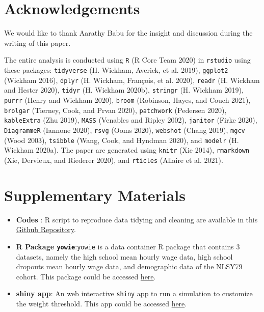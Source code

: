 \documentclass{article}
\begin{document}
\hypertarget{acknowledgements}{%
\section{Acknowledgements}\label{acknowledgements}}

We would like to thank Aarathy Babu for the insight and discussion during the writing of this paper.

The entire analysis is conducted using \texttt{R} (R Core Team 2020) in \texttt{rstudio} using these packages: \texttt{tidyverse} (H. Wickham, Averick, et al. 2019), \texttt{ggplot2} (Wickham 2016), \texttt{dplyr} (H. Wickham, François, et al. 2020), \texttt{readr} (H. Wickham and Hester 2020), \texttt{tidyr} (H. Wickham 2020b), \texttt{stringr} (H. Wickham 2019), \texttt{purrr} (Henry and Wickham 2020), \texttt{broom} (Robinson, Hayes, and Couch 2021), \texttt{brolgar} (Tierney, Cook, and Prvan 2020), \texttt{patchwork} (Pedersen 2020), \texttt{kableExtra} (Zhu 2019), \texttt{MASS} (Venables and Ripley 2002), \texttt{janitor} (Firke 2020), \texttt{DiagrammeR} (Iannone 2020), \texttt{rsvg} (Ooms 2020), \texttt{webshot} (Chang 2019), \texttt{mgcv} (Wood 2003), \texttt{tsibble} (Wang, Cook, and Hyndman 2020), and \texttt{modelr} (H. Wickham 2020a). The paper are generated using \texttt{knitr} (Xie 2014), \texttt{rmarkdown} (Xie, Dervieux, and Riederer 2020), and \texttt{rticles} (Allaire et al. 2021).

\hypertarget{supplementary-materials}{%
\section{Supplementary Materials}\label{supplementary-materials}}

\begin{itemize}
\item
  \textbf{Codes} : R script to reproduce data tidying and cleaning are available in this \href{https://github.com/numbats/yowie/blob/master/data-raw/data_preprocessing.R}{Github Repository}.
\item
  \textbf{R Package \texttt{yowie}}:\texttt{yowie} is a data container R package that contains 3 datasets, namely the high school mean hourly wage data, high school dropouts mean hourly wage data, and demographic data of the NLSY79 cohort. This package could be accessed \href{https://github.com/numbats/yowie}{here}.
\item
  \textbf{shiny app}: An web interactive \texttt{shiny} app to run a simulation to customize the weight threshold. This app could be accessed \href{https://github.com/numbats/summer-wages-refresh/tree/main/app}{here}.
\end{itemize}
\end{document}
